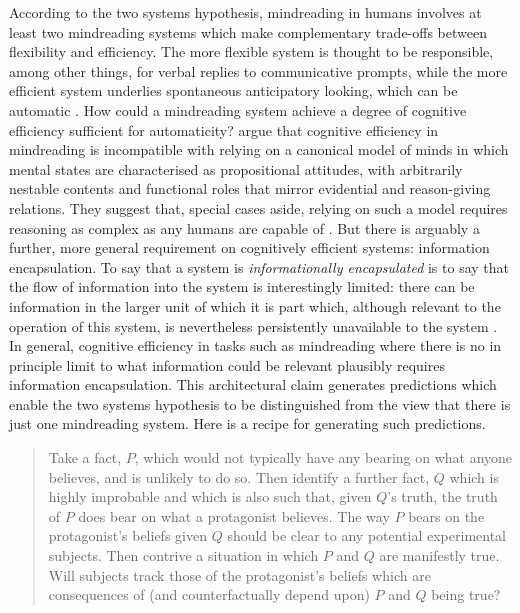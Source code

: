 \documentclass[12pt,\papersize]{extarticle}
\date{}
\begin{document}
\setlength\footnotesep{1em}




\maketitle

\noindent
According to the two systems hypothesis, mindreading in humans involves at least two mindreading systems which make complementary trade-offs between flexibility and efficiency.  
The more flexible system is thought to be responsible, among other things, for verbal replies to communicative prompts, while the more efficient system underlies spontaneous anticipatory looking, which can be automatic \citep{Low:2012_identity,low:2014_quack,wang:2015_limits,schneider:2014_task}.  
How could a mindreading system achieve a degree of cognitive efficiency sufficient for automaticity?
\citet{Apperly:2009ju} argue that cognitive efficiency in mindreading is incompatible with relying on a canonical model of minds in which mental states are characterised as propositional attitudes, with arbitrarily nestable contents and functional roles that mirror evidential and reason-giving relations.
They suggest that, special cases aside, relying on such a model requires reasoning as complex as any humans are capable of 
\citep[see also][]{Harris:1994az,Heal:1998uf}.
But there is arguably a further, more general requirement on cognitively efficient systems: information encapsulation.
To say that a system is \emph{informationally encapsulated} is to say that the flow of information into the system is interestingly limited: there can be information in the larger unit of which it is part which, although relevant to the operation of this system, is nevertheless persistently unavailable to the system \citep[pp.~64ff]{Fodor:1983dg}.
In general, cognitive efficiency in tasks such as mindreading where there is no in principle limit to what information could be relevant plausibly requires information encapsulation.
This architectural claim generates predictions which enable the two systems hypothesis to be distinguished from the view that there is just one mindreading system.
Here is a recipe for generating such predictions.
%
\begin{quote}
Take a fact, $P$, which would not typically have any bearing on what anyone believes, and is unlikely to do so.
Then identify a further fact, $Q$ which is highly improbable and which is also such that, given $Q$'s truth, the truth of $P$ does bear on what a protagonist believes.
The way $P$ bears on the protagonist's beliefs given $Q$ should be clear to any potential experimental subjects.
Then contrive a situation in which $P$ and $Q$ are manifestly true.
Will subjects track those of the protagonist’s beliefs which are consequences of (and counterfactually depend upon) $P$ and $Q$ being true?
\end{quote}
\end{document}
